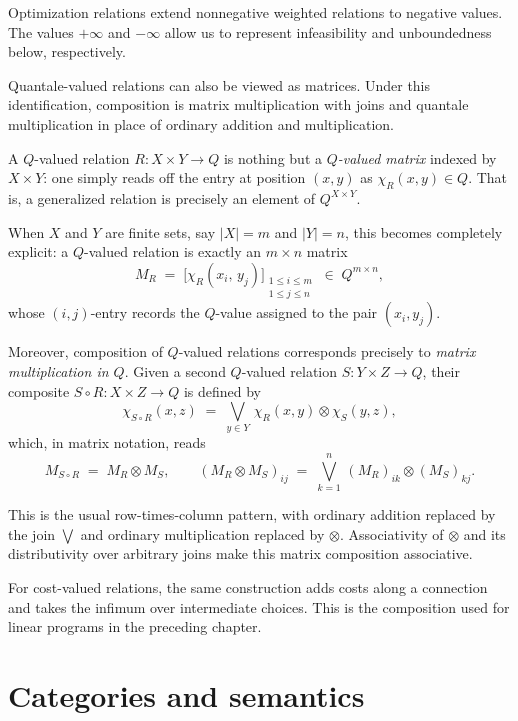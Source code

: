 Optimization relations extend nonnegative weighted relations to negative
values. The values $+\infty$ and $-\infty$ allow us to represent infeasibility
and unboundedness below, respectively.

Quantale-valued relations can also be viewed as matrices. Under this
identification, composition is matrix multiplication with joins and quantale
multiplication in place of ordinary addition and multiplication.

\begin{remark}
	A $Q$-valued relation $R : X \times Y \to Q$ is nothing but a
	\emph{$Q$-valued matrix} indexed by $X \times Y$: one simply reads
	off the entry at position $(x,y)$ as $\chi_R(x,y) \in Q$.
	That is, a generalized relation is precisely an element of $Q^{X \times Y}$.

\end{remark}

	\medskip
	\noindent
	When $X$ and $Y$ are finite sets, say $|X| = m$ and $|Y| = n$,
	this becomes completely explicit: a $Q$-valued relation is exactly
	an $m \times n$ matrix
	\[
		M_R \;=\; \bigl[\chi_R(x_i,\, y_j)\bigr]_{\substack{1 \leq i \leq m \\ 1 \leq j \leq n}}
		\;\in\; Q^{m \times n},
	\]
	whose $(i,j)$-entry records the $Q$-value assigned to the pair
	$(x_i, y_j)$.

	\medskip
	\noindent
	Moreover, composition of $Q$-valued relations corresponds precisely
	to \emph{matrix multiplication in $Q$}.
	Given a second $Q$-valued relation $S : Y \times Z \to Q$, their
	composite $S \circ R : X \times Z \to Q$ is defined by
	\[
		\chi_{S \circ R}(x, z)
		\;=\;
		\bigvee_{y \in Y}\, \chi_R(x,y) \otimes \chi_S(y,z),
	\]
	which, in matrix notation, reads
	\[
		M_{S \circ R} \;=\; M_R \otimes M_S,
		\qquad
		(M_R \otimes M_S)_{ij}
		\;=\;
		\bigvee_{k=1}^{n}\, (M_R)_{ik} \otimes (M_S)_{kj}.
	\]

	This is the usual row-times-column pattern, with ordinary addition replaced
by the join $\bigvee$ and ordinary multiplication replaced by $\otimes$.
Associativity of $\otimes$ and its distributivity over arbitrary joins make
this matrix composition associative.

For cost-valued relations, the same construction adds costs along a connection
and takes the infimum over intermediate choices. This is the composition used
for linear programs in the preceding chapter.


\section{Categories and semantics}

